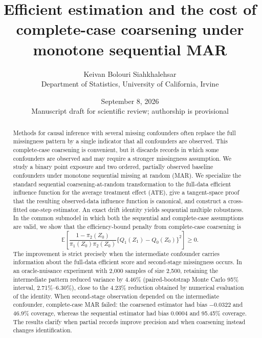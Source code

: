 \documentclass[11pt]{article}
\title{\vspace{-1.2cm}\textbf{Efficient estimation and the cost of complete-case coarsening under monotone sequential MAR}}
\author{Keivan Bolouri Siahkhalehsar\\
\small Department of Statistics, University of California, Irvine}
\date{September 8, 2026\ifinternal\\[4pt]\small Manuscript draft for scientific review; authorship is provisional\fi}
\newif\ifinternal
\theoremstyle{definition}
\newcommand{\E}{\mathbb{E}}
\newcommand{\1}{\mathbf{1}}
\begin{document}
\maketitle

\ifinternal
\begin{center}
\fcolorbox{navy}{lightblue}{\parbox{0.91\textwidth}{\small
\textbf{Review status.} This document is a research manuscript draft, not a submitted or peer-reviewed article. The theoretical results and software have been internally checked, and the reported primary simulation was independently rerun from the archived code. Independent statistical review and a substantive data application remain necessary before journal submission.}}
\end{center}
\fi

\begin{abstract}
Methods for causal inference with several missing confounders often replace the full missingness pattern by a single indicator that all confounders are observed. This complete-case coarsening is convenient, but it discards records in which some confounders are observed and may require a stronger missingness assumption. We study a binary point exposure and two ordered, partially observed baseline confounders under monotone sequential missing at random (MAR). We specialize the standard sequential coarsening-at-random transformation to the full-data efficient influence function for the average treatment effect (ATE), give a tangent-space proof that the resulting observed-data influence function is canonical, and construct a cross-fitted one-step estimator. An exact drift identity yields sequential multiple robustness. In the common submodel in which both the sequential and complete-case assumptions are valid, we show that the efficiency-bound penalty from complete-case coarsening is
\[
\E\!\left[\frac{1-\pi_2(Z_0)}{\pi_1(Z_0)\pi_2(Z_0)}
\{Q_1(Z_1)-Q_0(Z_0)\}^2\right]\ge 0.
\]
The improvement is strict precisely when the intermediate confounder carries information about the full-data efficient score and second-stage missingness occurs. In an oracle-nuisance experiment with 2,000 samples of size 2,500, retaining the intermediate pattern reduced variance by 4.46\% (paired-bootstrap Monte Carlo 95\% interval, 2.71\%--6.30\%), close to the 4.23\% reduction obtained by numerical evaluation of the identity. When second-stage observation depended on the intermediate confounder, complete-case MAR failed: the coarsened estimator had bias $-0.0322$ and 46.9\% coverage, whereas the sequential estimator had bias $0.0004$ and 95.45\% coverage. The results clarify when partial records improve precision and when coarsening instead changes identification.
\end{abstract}
\end{document}
